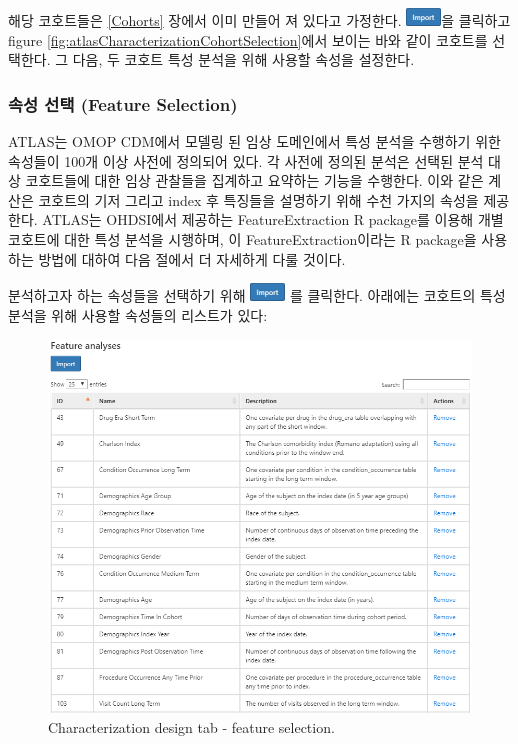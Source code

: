 \documentclass[11pt]{book}
\theoremstyle{definition}
\theoremstyle{definition}
\theoremstyle{definition}
\theoremstyle{remark}
\begin{document}
해당 코호트들은 \ref{Cohorts} 장에서 이미 만들어 져 있다고 가정한다.
\includegraphics{images/Characterization/atlasImportButton.png}을
클릭하고 figure \ref{fig:atlasCharacterizationCohortSelection}에서
보이는 바와 같이 코호트를 선택한다. 그 다음, 두 코호트 특성 분석을 위해
사용할 속성을 설정한다.

\subsubsection*{속성 선택 (Feature
Selection)}\label{--feature-selection}

ATLAS는 OMOP CDM에서 모델링 된 임상 도메인에서 특성 분석을 수행하기 위한
속성들이 100개 이상 사전에 정의되어 있다. 각 사전에 정의된 분석은 선택된
분석 대상 코호트들에 대한 임상 관찰들을 집계하고 요약하는 기능을
수행한다. 이와 같은 계산은 코호트의 기저 그리고 index 후 특징들을
설명하기 위해 수천 가지의 속성을 제공한다. ATLAS는 OHDSI에서 제공하는
FeatureExtraction R package를 이용해 개별 코호트에 대한 특성 분석을
시행하며, 이 FeatureExtraction이라는 R package을 사용하는 방법에 대하여
다음 절에서 더 자세하게 다룰 것이다. 

분석하고자 하는 속성들을 선택하기 위해
\includegraphics{images/Characterization/atlasImportButton.png} 를
클릭한다. 아래에는 코호트의 특성 분석을 위해 사용할 속성들의 리스트가
있다:

\begin{figure}

{\centering \includegraphics[width=1\linewidth]{images/Characterization/atlasCharacterizationFeatureSelection} 

}

\caption{Characterization design tab - feature selection.}\label{fig:atlasCharacterizationFeatureSelection}
\end{figure}
\end{document}

